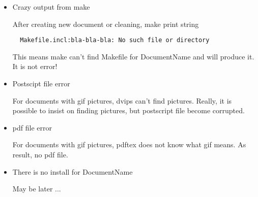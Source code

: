 \documentclass{howto}
\begin{document}
\begin{itemize}
  \item Crazy output from make
  
  
  After creating new document or cleaning, make print string  
  \begin{verbatim}
  Makefile.incl:bla-bla-bla: No such file or directory
  \end{verbatim}
  This means make can't find Makefile for DocumentName and will produce it.
  It is not error!

  \item Postscipt file error


  For documents with gif pictures, dvips can't find pictures. Really, it is
  possible to insist on finding pictures, but postscript file become corrupted. 


  \item pdf file error


  For documents with gif pictures, pdftex does not know what gif means. As
  result, no pdf file.  

  \item There is no install for DocumentName 


   May be later ...
\end{itemize}
\end{document}
